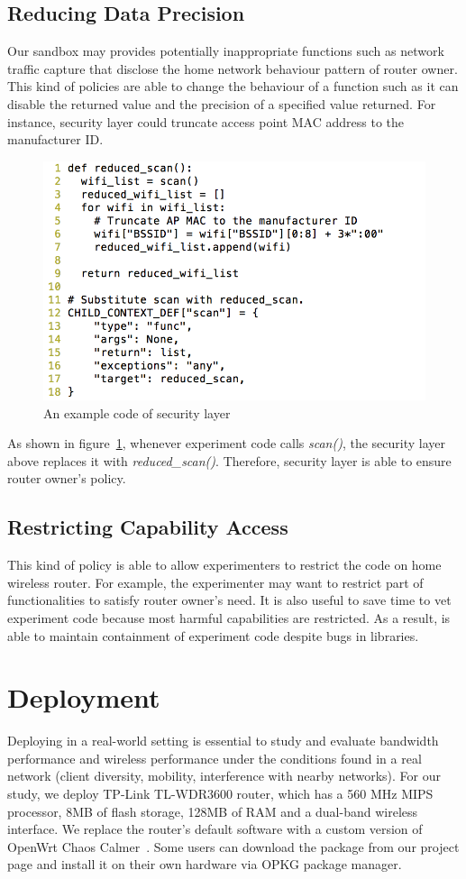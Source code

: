 \subsection{Reducing Data Precision}
Our sandbox may provides potentially inappropriate functions such as network traffic capture that disclose the home network behaviour pattern of router owner. This kind of policies are able to change the behaviour of a function such as it can disable the returned value and the precision of a specified value returned. For instance, security layer could truncate access point MAC address to the manufacturer ID.

\begin{figure}%
\centering
\includegraphics[width=0.8\columnwidth]{figure/example.png}
\caption{An example code of security layer}
\label{fig-examplecode}
\end{figure}

As shown in figure~\ref{fig-examplecode}, whenever experiment code calls \textit{scan()}, the security layer above replaces it with \textit{reduced\_scan()}. Therefore, security layer is able to ensure router owner's policy.

\subsection{Restricting Capability Access}
This kind of policy is able to allow experimenters to restrict the code on home wireless router. For example, the experimenter may want to restrict part of functionalities to satisfy router owner's need. It is also useful to save time to vet experiment code because most harmful capabilities are restricted. As a result, \sysname is able to maintain containment of experiment code despite bugs in libraries.
 
\section{Deployment}
Deploying \sysname in a real-world setting is essential to study and evaluate bandwidth performance and wireless performance under the conditions found in a real network (client diversity, mobility, interference with nearby networks). For our study, we deploy TP-Link TL-WDR3600 router, which has a 560 MHz MIPS processor, 8MB of flash storage, 128MB of RAM and a dual-band wireless interface. We replace the router's default software with a custom version of OpenWrt Chaos Calmer~\cite{openwrt}. Some users can download the \sysname package from our project page and install it on their own hardware via OPKG package manager.


